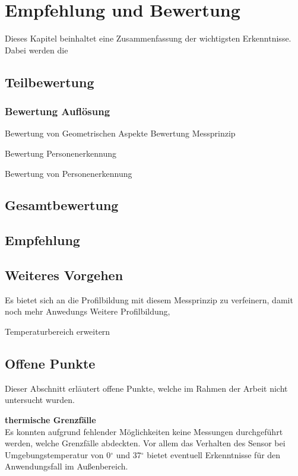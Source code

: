 \chapter{Empfehlung und Bewertung}
\label{Empfehlung_Vorgehen}

Dieses Kapitel beinhaltet eine Zusammenfassung der wichtigsten Erkenntnisse. Dabei werden die 

\section{Teilbewertung}
\label{sec:Teilbewertung}

\subsection{Bewertung Auflösung}

Bewertung von Geometrischen Aspekte
Bewertung Messprinzip

Bewertung Personenerkennung

Bewertung von Personenerkennung

\section{Gesamtbewertung}
\label{sec:Gesamtbewetung}




\section{Empfehlung}
\label{sec:Empfehlung}



\section{Weiteres Vorgehen}

Es bietet sich an die Profilbildung mit diesem Messprinzip zu verfeinern, damit noch mehr Anwedungs
Weitere Profilbildung, 

Temperaturbereich erweitern

\section{Offene Punkte}

Dieser Abschnitt erläutert offene Punkte, welche im Rahmen der Arbeit nicht untersucht wurden.

\textbf{thermische Grenzfälle}\\
Es konnten aufgrund fehlender Möglichkeiten keine Messungen durchgeführt werden, welche Grenzfälle abdeckten. Vor allem das Verhalten des Sensor bei Umgebungstemperatur von 0$^\circ$ und 37$^\circ$ bietet eventuell Erkenntnisse für den Anwendungsfall im Außenbereich.

